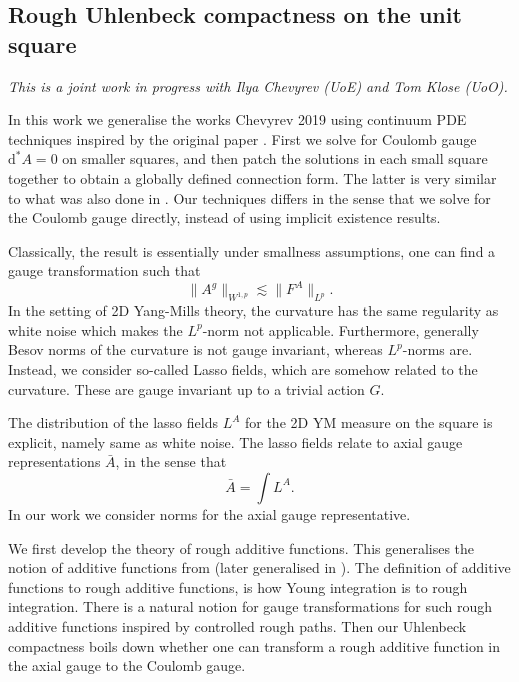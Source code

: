 \documentclass[11pt]{article}
\numberwithin{equation}{section}
\theoremstyle{definition}
\theoremstyle{remark}
\newcommand{\diff}{\mathrm{d}}
\newcommand{\1}{\mathbf 1}
\newcommand{\<}{\langle}
\renewcommand{\>}{\rangle}
\begin{document}

\subsection{Rough Uhlenbeck compactness on the unit square}\label{sec:RUC_square}
\textit{This is a joint work in progress with Ilya Chevyrev (UoE) and Tom Klose (UoO).}

\medskip

\noindent In this work we generalise the works Chevyrev 2019 using continuum PDE techniques inspired by the original paper \cite{Uhlenbeck82}. First we solve for Coulomb gauge $\diff^*A=0$ on smaller squares, and then patch the solutions in each small square together to obtain a globally defined connection form. The latter is very similar to what was also done in \cite{Uhlenbeck82}. Our techniques differs in the sense that we solve for the Coulomb gauge directly, instead of using implicit existence results. 

Classically, the result is essentially under smallness assumptions, one can find a gauge transformation such that 
\[
\|A^g\|_{W^{1,p}}\lesssim \|F^A\|_{L^p}.
\]
In the setting of 2D Yang-Mills theory, the curvature has the same regularity as white noise which makes the $L^p$-norm not applicable. Furthermore, generally Besov norms of the curvature is not gauge invariant, whereas $L^p$-norms are. Instead, we consider so-called Lasso fields, which are somehow related to the curvature. These are gauge invariant up to a trivial action $G$. 

The distribution of the lasso fields $L^A$ for the 2D YM measure on the square is explicit, namely same as white noise. The lasso fields relate to axial gauge representations $\bar A$, in the sense that 
\[
\bar A=\int L^A. 
\]
In our work we consider norms for the axial gauge representative. 

We first develop the theory of rough additive functions. This generalises the notion of additive functions from \cite{Chevyrev19} (later generalised in \cite{CCHS2d}). The definition of additive functions to rough additive functions, is how Young integration is to rough integration. There is a natural notion for gauge transformations for such rough additive functions inspired by controlled rough paths. Then our Uhlenbeck compactness boils down whether one can transform a rough additive function in the axial gauge to the Coulomb gauge. 
\end{document}

